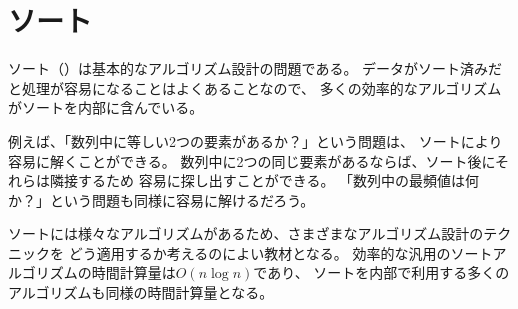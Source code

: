 \begin{comment}
\chapter{Sorting}
\end{comment}
\chapter{ソート}


\begin{comment}
\key{Sorting}
is a fundamental algorithm design problem.
Many efficient algorithms
use sorting as a subroutine,
because it is often easier to process
data if the elements are in a sorted order.

For example, the problem ''does an array contain
two equal elements?'' is easy to solve using sorting.
If the array contains two equal elements,
they will be next to each other after sorting,
so it is easy to find them.
Also, the problem ''what is the most frequent element
in an array?'' can be solved similarly.
\end{comment}

ソート（）は基本的なアルゴリズム設計の問題である。
データがソート済みだと処理が容易になることはよくあることなので、
多くの効率的なアルゴリズムがソートを内部に含んでいる。

例えば、「数列中に等しい2つの要素があるか？」という問題は、
ソートにより容易に解くことができる。
数列中に2つの同じ要素があるならば、ソート後にそれらは隣接するため
容易に探し出すことができる。
「数列中の最頻値は何か？」という問題も同様に容易に解けるだろう。

\begin{comment}
There are many algorithms for sorting, and they are
also good examples of how to apply
different algorithm design techniques.
The efficient general sorting algorithms
work in $O(n \log n)$ time,
and many algorithms that use sorting
as a subroutine also
have this time complexity.
\end{comment}

ソートには様々なアルゴリズムがあるため、さまざまなアルゴリズム設計のテクニックを
どう適用するか考えるのによい教材となる。
効率的な汎用のソートアルゴリズムの時間計算量は$O(n \log n)$であり、
ソートを内部で利用する多くのアルゴリズムも同様の時間計算量となる。

\begin{comment}
\section{Sorting theory}

The basic problem in sorting is as follows:
\begin{framed}
\noindent
Given an array that contains $n$ elements,
your task is to sort the elements
in increasing order.
\end{framed}
\noindent
For example, the array
\end{comment}

